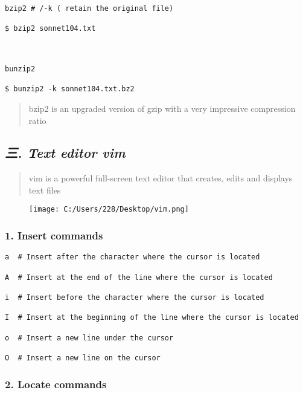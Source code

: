 \documentclass[
]{article}
\begin{document}
\begin{verbatim}
bzip2 # /-k ( retain the original file)

$ bzip2 sonnet104.txt



bunzip2

$ bunzip2 -k sonnet104.txt.bz2
\end{verbatim}

\begin{quote}
bzip2 is an upgraded version of gzip with a very impressive compression
ratio
\end{quote}

\hypertarget{header-n132}{%
\subsection{\texorpdfstring{\emph{三. Text editor
vim}}{三. Text editor vim}}\label{header-n132}}

\begin{quote}
vim is a powerful full-screen text editor that creates, edits and
displays text files
\end{quote}

\begin{figure}
\centering
\texttt{[image: C:/Users/228/Desktop/vim.png]}
\caption{}
\end{figure}

\hypertarget{header-n138}{%
\subsubsection{1. Insert commands}\label{header-n138}}

\begin{verbatim}
a  # Insert after the character where the cursor is located

A  # Insert at the end of the line where the cursor is located

i  # Insert before the character where the cursor is located

I  # Insert at the beginning of the line where the cursor is located

o  # Insert a new line under the cursor

O  # Insert a new line on the cursor
\end{verbatim}

\hypertarget{header-n142}{%
\subsubsection{2. Locate commands}\label{header-n142}}
\end{document}
